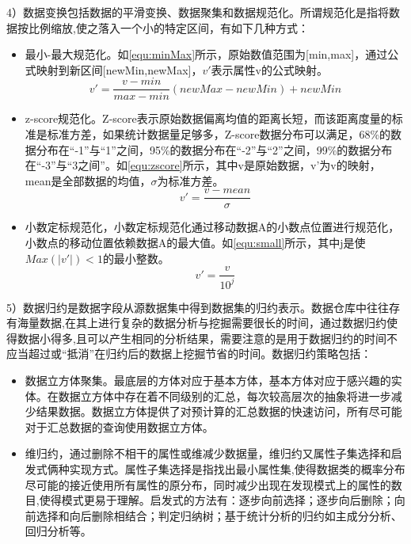   4）数据变换包括数据的平滑变换、数据聚集和数据规范化。所谓规范化是指将数据按比例缩放,使之落入一个小的特定区间，有如下几种方式：
  \begin{itemize}
  \item 最小-最大规范化。如\autoref{equ:minMax}所示，原始数值范围为[min,max]，通过公式映射到新区间[newMin,newMax]，$v'$表示属性v的公式映射。
  \begin{equation}
    v' = \frac{v-min}{max-min}(newMax-newMin)+newMin
    \label{equ:minMax}
  \end{equation}
  \item z-score规范化。Z-score表示原始数据偏离均值的距离长短，而该距离度量的标准是标准方差，如果统计数据量足够多，Z-score数据分布可以满足，68\%的数据分布在“-1”与“1”之间，95\%的数据分布在“-2”与“2”之间，99\%的数据分布在“-3”与“3之间”。如\autoref{equ:zscore}所示，其中v是原始数据，v'为v的映射，mean是全部数据的均值，$\sigma$为标准方差。
  \begin{equation}
    v' = \frac{v-mean}{\sigma}
    \label{equ:zscore}
  \end{equation}
  \item 小数定标规范化，小数定标规范化通过移动数据A的小数点位置进行规范化，小数点的移动位置依赖数据A的最大值。如\autoref{equ:small}所示，其中j是使$Max(| v'|)<1$的最小整数。
  \begin{equation}
    v' = \frac{v}{10^j}
    \label{equ:small}
  \end{equation}
  \end{itemize} 

  5）数据归约是数据字段从源数据集中得到数据集的归约表示。数据仓库中往往存有海量数据,在其上进行复杂的数据分析与挖掘需要很长的时间，通过数据归约使得数据小得多,且可以产生相同的分析结果，需要注意的是用于数据归约的时间不应当超过或“抵消”在归约后的数据上挖掘节省的时间。数据归约策略包括：
  \begin{itemize}
  \item 数据立方体聚集。最底层的方体对应于基本方体，基本方体对应于感兴趣的实体。在数据立方体中存在着不同级别的汇总，每次较高层次的抽象将进一步减少结果数据。数据立方体提供了对预计算的汇总数据的快速访问，所有尽可能对于汇总数据的查询使用数据立方体。
  \item 维归约，通过删除不相干的属性或维减少数据量，维归约又属性子集选择和启发式俩种实现方式。属性子集选择是指找出最小属性集,使得数据类的概率分布尽可能的接近使用所有属性的原分布，同时减少出现在发现模式上的属性的数目,使得模式更易于理解。启发式的方法有：逐步向前选择；逐步向后删除；向前选择和向后删除相结合；判定归纳树；基于统计分析的归约如主成分分析、回归分析等。
  \end{itemize}

